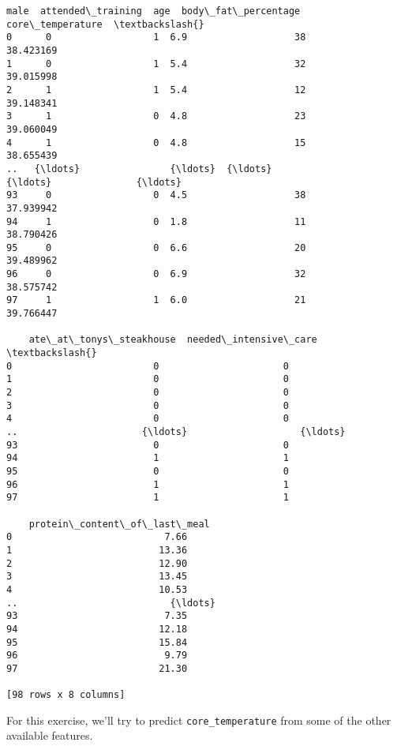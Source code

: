 \documentclass[11pt]{article}
\makeatletter
\newcommand{\boxspacing}{\kern\kvtcb@left@rule\kern\kvtcb@boxsep}
\newcommand{\prompt}[4]{
        {\ttfamily\llap{{\color{#2}[#3]:\hspace{3pt}#4}}\vspace{-\baselineskip}}
    }
\makeatother
\begin{document}
            \begin{tcolorbox}[breakable, size=fbox, boxrule=.5pt, pad at break*=1mm, opacityfill=0]
\prompt{Out}{outcolor}{1}{\boxspacing}
\begin{Verbatim}[commandchars=\\\{\}]
    male  attended\_training  age  body\_fat\_percentage  core\_temperature  \textbackslash{}
0      0                  1  6.9                   38         38.423169
1      0                  1  5.4                   32         39.015998
2      1                  1  5.4                   12         39.148341
3      1                  0  4.8                   23         39.060049
4      1                  0  4.8                   15         38.655439
..   {\ldots}                {\ldots}  {\ldots}                  {\ldots}               {\ldots}
93     0                  0  4.5                   38         37.939942
94     1                  0  1.8                   11         38.790426
95     0                  0  6.6                   20         39.489962
96     0                  0  6.9                   32         38.575742
97     1                  1  6.0                   21         39.766447

    ate\_at\_tonys\_steakhouse  needed\_intensive\_care  \textbackslash{}
0                         0                      0
1                         0                      0
2                         0                      0
3                         0                      0
4                         0                      0
..                      {\ldots}                    {\ldots}
93                        0                      0
94                        1                      1
95                        0                      0
96                        1                      1
97                        1                      1

    protein\_content\_of\_last\_meal
0                           7.66
1                          13.36
2                          12.90
3                          13.45
4                          10.53
..                           {\ldots}
93                          7.35
94                         12.18
95                         15.84
96                          9.79
97                         21.30

[98 rows x 8 columns]
\end{Verbatim}
\end{tcolorbox}
        
    For this exercise, we'll try to predict \texttt{core\_temperature} from
some of the other available features.
\end{document}
